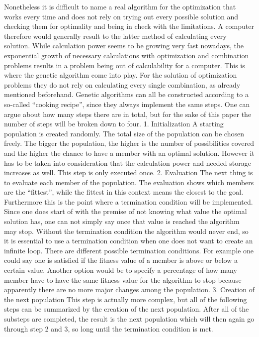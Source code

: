\documentclass[11pt,a4paper]{article}
\begin{document}
Nonetheless it is difficult to name a real algorithm for the optimization that works every time and does not rely on trying out every possible solution and checking them for optimality and being in check with the limitations. A computer therefore would generally result to the latter method of calculating every solution.
While calculation power seems to be growing very fast nowadays, the exponential growth of necessary calculations with optimization and combination problems results in a problem being out of calculability for a computer.
This is where the genetic algorithm come into play. For the solution of optimization problems they do not rely on calculating every single combination, as already mentioned beforehand.
Genetic algorithms can all be constructed according to a so-called “cooking recipe”, since they always implement the same steps. One can argue about how many steps there are in total, but for the sake of this paper the number of steps will be broken down to four.
1.    Initialization
A starting population is created randomly. The total size of the population can be chosen freely. The bigger the population, the higher is the number of possibilities covered and the higher the chance to have a member with an optimal solution. However it has to be taken into consideration that the calculation power and needed storage increases as well.
This step is only executed once.
2.    Evaluation
The next thing is to evaluate each member of the population. The evaluation shows which members are the “fittest”, while the fittest in this context means the closest to the goal.
Furthermore this is the point where a termination condition will be implemented. Since one does start of with the premise of not knowing what value the optimal solution has, one can not simply say once that value is reached the algorithm may stop. Without the termination condition the algorithm would never end, so it is essential to use a termination condition when one does not want to create an infinite loop. There are different possible termination conditions. For example one could say one is satisfied if the fitness value of a member is above or below a certain value. Another option would be to specify a percentage of how many member have to have the same fitness value for the algorithm to stop because apparently there are no more major changes among the population.
3.    Creation of the next population
This step is actually more complex, but all of the following steps can be summarized by the creation of the next population. After all of the substeps are completed, the result is the next population which will then again go through step 2 and 3, so long until the termination condition is met.
\end{document}
